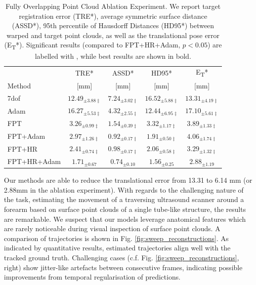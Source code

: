 \begin{table}[t]
    \caption{Fully Overlapping Point Cloud Ablation Experiment. We report target registration error (TRE*), average symmetric surface distance (ASSD*), 95th percentile of Hausdorff Distances (HD95*) between warped and target point clouds, as well as the translational pose error (E\textsubscript{T}*). Significant results (compared to FPT+HR+Adam, $p<0.05$) are labelled with \textdaggerdbl, while best results are shown in bold.}
    \centering
    \label{tab:ablation_toy}%
    \begin{tabular}{lcccc}
    \toprule
     & TRE*  & ASSD*  & HD95*  & E\textsubscript{T}*  \\
    Method & [mm] & [mm] & [mm] & [mm] \\
    \midrule
7dof & $12.49_{\pm 3.88\ddagger}$ & $7.24_{\pm 3.02\ddagger}$ & $16.52_{\pm 5.88\ddagger}$ & $13.31_{\pm 4.19\ddagger}$ \\
Adam & $16.27_{\pm 5.53\ddagger}$ & $4.32_{\pm 2.55\ddagger}$ & $12.44_{\pm 6.95\ddagger}$ & $17.10_{\pm 5.61\ddagger}$ \\
FPT & $3.26_{\pm 0.99\ddagger}$ & $1.54_{\pm 0.39\ddagger}$ & $3.32_{\pm 1.17\ddagger}$ & $3.89_{\pm 1.33\ddagger}$ \\
FPT+Adam & $2.97_{\pm 1.26\ddagger}$ & $0.92_{\pm 0.17\ddagger}$ & $1.91_{\pm 0.50\ddagger}$ & $4.06_{\pm 1.74\ddagger}$ \\
FPT+HR & $2.41_{\pm 0.74\ddagger}$ & $0.98_{\pm 0.17\ddagger}$ & $2.06_{\pm 0.58\ddagger}$ & $3.29_{\pm 1.32\ddagger}$ \\
FPT+HR+Adam & $\mathbf{1.71_{\pm 0.67}}$ & $\mathbf{0.74_{\pm 0.10}}$ & $\mathbf{1.56_{\pm 0.25}}$ & $\mathbf{2.88_{\pm 1.19}}$ \\
    \bottomrule
    \end{tabular}
\end{table}

Our methods are able to reduce the translational error from 13.31 to 6.14 mm (or 2.88mm in the ablation experiment). With regards to the challenging nature of the task, estimating the movement of a traversing ultrasound scanner around a forearm based on surface point clouds of a single tube-like structure, the results are remarkable.  We suspect that our models leverage anatomical features which are rarely noticeable during visual inspection of surface point clouds. A comparison of trajectories is shown in Fig. \ref{fig:sweep_reconstructions}. As indicated by quantitative results, estimated trajectories align well with the tracked ground truth. Challenging cases (c.f. Fig. \ref{fig:sweep_reconstructions}, right) show jitter-like artefacts between consecutive frames, indicating possible improvements from temporal regularisation of predictions.


